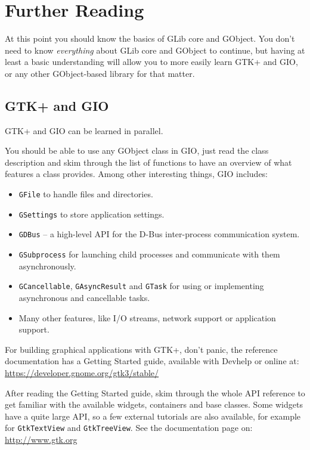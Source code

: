 \chapter{Further Reading}
\label{further-reading}

At this point you should know the basics of GLib core and GObject. You don't need to know \emph{everything} about GLib core and GObject to continue, but having at least a basic understanding will allow you to more easily learn GTK+ and GIO, or any other GObject-based library for that matter.

\section{GTK+ and GIO}
GTK+ and GIO can be learned in parallel.

You should be able to use any GObject class in GIO, just read the class description and skim through the list of functions to have an overview of what features a class provides. Among other interesting things, GIO includes:
\begin{itemize}
  \item \lstinline{GFile} to handle files and directories.
  \item \lstinline{GSettings} to store application settings.
  \item \lstinline{GDBus} -- a high-level API for the D-Bus inter-process communication system.
  \item \lstinline{GSubprocess} for launching child processes and communicate with them asynchronously.
  \item \lstinline{GCancellable}, \lstinline{GAsyncResult} and \lstinline{GTask} for using or implementing asynchronous and cancellable tasks.
  \item Many other features, like I/O streams, network support or application support.
\end{itemize}

For building graphical applications with GTK+, don't panic, the reference documentation has a Getting Started guide, available with Devhelp or online at:\\
\url{https://developer.gnome.org/gtk3/stable/}

After reading the Getting Started guide, skim through the whole API reference to get familiar with the available widgets, containers and base classes. Some widgets have a quite large API, so a few external tutorials are also available, for example for \lstinline{GtkTextView} and \lstinline{GtkTreeView}. See the documentation page on:\\
\url{http://www.gtk.org}

